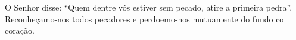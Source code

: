 O Senhor disse: ``Quem dentre vós estiver sem pecado, atire a primeira pedra''. Reconheçamo-nos todos pecadores e perdoemo-nos mutuamente do fundo co coração.
